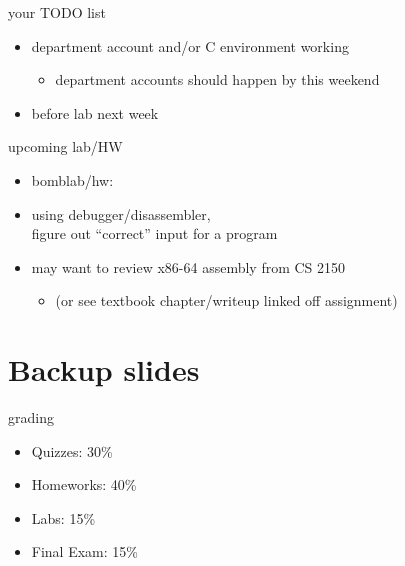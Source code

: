 \begin{frame}{your TODO list}
    \begin{itemize}
    \item department account and/or C environment working
        \begin{itemize}
        \item department accounts should happen by this weekend
        \end{itemize}
    \item before lab next week
    \end{itemize}
\end{frame}

\begin{frame}{upcoming lab/HW}
    \begin{itemize}
    \item bomblab/hw:
    \item using debugger/disassembler, \\ figure out ``correct'' input for a program
    \item may want to review x86-64 assembly from CS 2150
        \begin{itemize}
        \item (or see textbook chapter/writeup linked off assignment)
        \end{itemize}
    \end{itemize}
\end{frame}

\section{Backup slides}

\begin{frame}{grading}
    \begin{itemize}
    \item Quizzes: 30\%
    \item Homeworks: 40\%
    \item Labs: 15\%
    \item Final Exam: 15\%
    \end{itemize}
\end{frame}

\begin{frame}
\end{frame}
